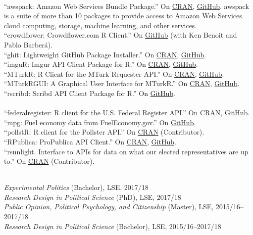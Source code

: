 \documentclass[12pt]{article}
\renewcommand{\section}[1]{\pagebreak[3]%
    \llap{\scshape\smash{\parbox[t]{\marginparwidth}{\raggedright {\color{lg}#1}}}}%
    \vspace{-\baselineskip}\par}
\newcommand{\topic}[1]{\pagebreak[3]\indent {\color{lg}{\footnotesize #1 }}\\}
\newcommand{\entry}[1]{\indent {\color{lg}\guillemotright}\hspace{2pt}#1\vspace{.25em}\\}
\begin{document}
{	\topic{R packages contributed to the cloudyr project}
	\entry{``awspack: Amazon Web Services Bundle Package.'' On \href{https://cran.r-project.org/package=awspack}{CRAN}, \href{https://github.com/cloudyr/awspack}{GitHub}. awspack is a suite of more than 10 packages to provide access to Amazon Web Services cloud computing, storage, machine learning, and other services.}
	\entry{``crowdflower: Crowdflower.com R Client.'' On \href{https://github.com/cloudyr/crowdflower}{GitHub} (with Ken Benoit and Pablo Barber\'{a}).}
	\entry{``ghit: Lightweight GitHub Package Installer.'' On \href{https://cran.r-project.org/package=ghit}{CRAN}, \href{https://github.com/cloudyr/ghit}{GitHub}.}
	\entry{``imguR: Imgur API Client Package for R.'' On \href{https://cran.r-project.org/package=imguR}{CRAN}, \href{https://github.com/cloudyr/imguR}{GitHub}.}
	\entry{``MTurkR: R Client for the MTurk Requester API.'' On \href{https://cran.r-project.org/package=MTurkR}{CRAN}, \href{https://github.com/leeper/MTurkR}{GitHub}.}
	\entry{``MTurkRGUI: A Graphical User Interface for MTurkR.'' On \href{https://cran.r-project.org/package=MTurkRGUI}{CRAN}, \href{https://github.com/leeper/MTurkRGUI}{GitHub}.}
	\entry{``rscribd: Scribd API Client Package for R.'' On \href{https://github.com/cloudyr/rscribd}{GitHub}.}
	
	\topic{R packages contributed to the rOpenGov project}
	\entry{``federalregister: R client for the U.S. Federal Register API.'' On \href{https://cran.r-project.org/package=federalregister}{CRAN}, \href{https://github.com/rOpenGov/federalregister}{GitHub}.}
	\entry{``mpg: Fuel economy data from FuelEconomy.gov.'' On \href{https://github.com/rOpenGov/mpg}{GitHub}.}
	\entry{``pollstR: R client for the Pollster API.'' On \href{https://cran.r-project.org/package=pollstR}{CRAN} (Contributor).}
	\entry{``RPublica: ProPublica API Client.'' On \href{https://cran.r-project.org/package=RPublica}{CRAN}, \href{https://github.com/rOpenGov/RPublica}{GitHub}.}
	\entry{``rsunlight. Interface to APIs for data on what our elected representatives are up to.'' On \href{https://cran.r-project.org/package=rsunlight}{CRAN} (Contributor).}

\section{Teaching \&\\ Advising}
\topic{Lecturing: London School of Economics and Political Science}
	\entry{\textit{Experimental Politics} (Bachelor), LSE, 2017/18}
	\entry{\textit{Research Design in Political Science} (PhD), LSE, 2017/18}
	\entry{\textit{Public Opinion, Political Psychology, and Citizenship} (Master), LSE, 2015/16--2017/18}
	\entry{\textit{Research Design in Political Science} (Bachelor), LSE, 2015/16--2017/18}

}
\end{document}
